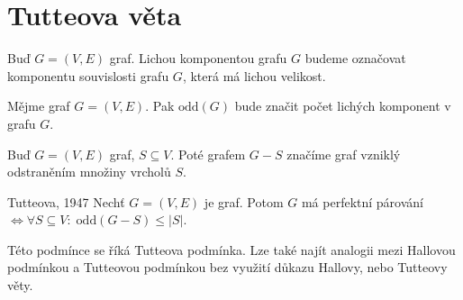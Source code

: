 \section{Tutteova věta}

\begin{t_definition}
  Buď $G=(V,E)$ graf. Lichou komponentou grafu $G$ budeme označovat komponentu souvislosti grafu $G$, která má lichou velikost.
\end{t_definition}

\begin{t_definition}
  Mějme graf $G=(V,E)$. Pak $\mathrm{odd}(G)$ bude značit počet lichých komponent v grafu $G$.
\end{t_definition}

\begin{t_definition}
  Buď $G=(V,E)$ graf, $S \subseteq V$. Poté grafem $G-S$ značíme graf vzniklý odstraněním množiny vrcholů $S$.
\end{t_definition}

\begin{t_theorem}{Tutteova, 1947}
  Nechť $G=(V,E)$ je graf. Potom $G$ má perfektní párování $\iff \forall S \subseteq V : \; \mathrm{odd}(G-S) \leq |S|$.
\end{t_theorem}
\begin{t_remark}
  Této podmínce se říká Tutteova podmínka. Lze také najít analogii mezi Hallovou podmínkou a Tutteovou podmínkou bez využití důkazu Hallovy, nebo Tutteovy věty.
\end{t_remark}

